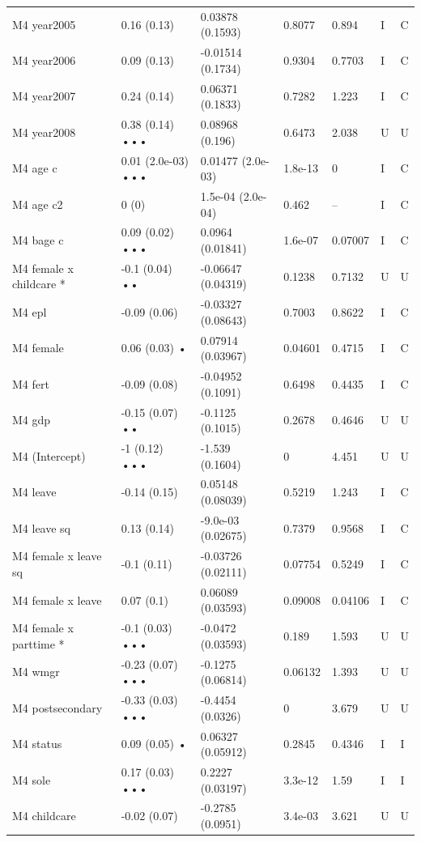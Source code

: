 {\begin{longtable}{@{}p{.245\linewidth}p{.17\linewidth}p{.17\linewidth}p{.085\linewidth}p{.060\linewidth}p{.08\linewidth}p{.07\linewidth}@{}}
M4 year2005 & 0.16 (0.13) & 0.03878 (0.1593) & 0.8077 & 0.894 & I & C\\
M4 year2006 & 0.09 (0.13) & -0.01514 (0.1734) & 0.9304 & 0.7703 & I & C\\
M4 year2007 & 0.24 (0.14) & 0.06371 (0.1833) & 0.7282 & 1.223 & I & C\\
M4 year2008 & 0.38 (0.14) ••• & 0.08968 (0.196) & 0.6473 & 2.038 & U & U\\
M4 age c & 0.01 (2.0e-03) ••• & 0.01477 (2.0e-03) & 1.8e-13 & 0 & I & C\\
M4 age c2 & 0 (0) & 1.5e-04 (2.0e-04) & 0.462 & -- & I & C\\
M4 bage c & 0.09 (0.02) ••• & 0.0964 (0.01841) & 1.6e-07 & 0.07007 & I & C\\
M4 female x childcare * & -0.1 (0.04) •• & -0.06647 (0.04319) & 0.1238 & 0.7132 & U & U\\
M4 epl & -0.09 (0.06) & -0.03327 (0.08643) & 0.7003 & 0.8622 & I & C\\
M4 female & 0.06 (0.03) • & 0.07914 (0.03967) & 0.04601 & 0.4715 & I & C\\
M4 fert & -0.09 (0.08) & -0.04952 (0.1091) & 0.6498 & 0.4435 & I & C\\
M4 gdp & -0.15 (0.07) •• & -0.1125 (0.1015) & 0.2678 & 0.4646 & U & U\\
M4 (Intercept) & -1 (0.12) ••• & -1.539 (0.1604) & 0 & 4.451 & U & U\\
M4 leave & -0.14 (0.15) & 0.05148 (0.08039) & 0.5219 & 1.243 & I & C\\
M4 leave sq & 0.13 (0.14) & -9.0e-03 (0.02675) & 0.7379 & 0.9568 & I & C\\
M4 female x leave sq & -0.1 (0.11) & -0.03726 (0.02111) & 0.07754 & 0.5249 & I & C\\
M4 female x leave & 0.07 (0.1) & 0.06089 (0.03593) & 0.09008 & 0.04106 & I & C\\
M4 female x parttime * & -0.1 (0.03) ••• & -0.0472 (0.03593) & 0.189 & 1.593 & U & U\\
M4 wmgr & -0.23 (0.07) ••• & -0.1275 (0.06814) & 0.06132 & 1.393 & U & U\\
M4 postsecondary & -0.33 (0.03) ••• & -0.4454 (0.0326) & 0 & 3.679 & U & U\\
M4 status & 0.09 (0.05) • & 0.06327 (0.05912) & 0.2845 & 0.4346 & I & I\\
M4 sole & 0.17 (0.03) ••• & 0.2227 (0.03197) & 3.3e-12 & 1.59 & I & I\\
M4 childcare & -0.02 (0.07) & -0.2785 (0.0951) & 3.4e-03 & 3.621 & U & U\\

\end{longtable}}
